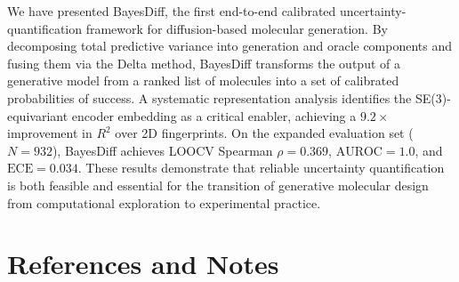 \documentclass{article}
\begin{document}
We have presented BayesDiff, the first end-to-end calibrated
uncertainty-quantification framework for diffusion-based molecular
generation.  By decomposing total predictive variance into generation and
oracle components and fusing them via the Delta method, BayesDiff
transforms the output of a generative model from a ranked list of
molecules into a set of calibrated probabilities of success.  A
systematic representation analysis identifies the SE(3)-equivariant
encoder embedding as a critical enabler, achieving a $9.2\times$
improvement in $R^{2}$ over 2D fingerprints.  On the expanded evaluation
set ($N = 932$), BayesDiff achieves LOOCV Spearman $\rho = 0.369$,
$\mathrm{AUROC} = 1.0$, and $\mathrm{ECE} = 0.034$.  These results
demonstrate that reliable uncertainty quantification is both feasible and
essential for the transition of generative molecular design from
computational exploration to experimental practice.


\section*{References and Notes}
\end{document}
